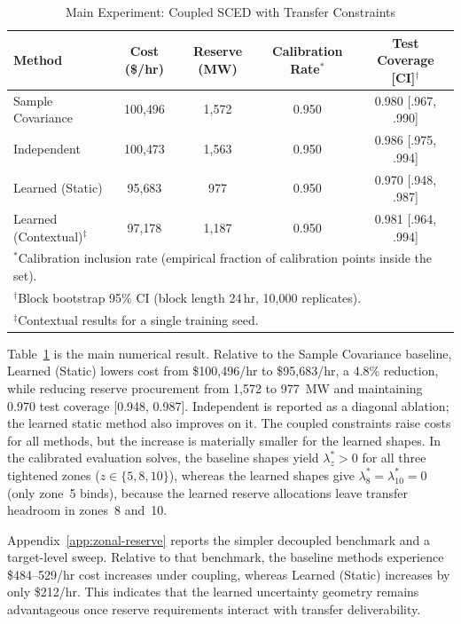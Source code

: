 \documentclass[11pt]{article}
\theoremstyle{definition}
\begin{document}
\begin{table}[!t]
\caption{Main Experiment: Coupled SCED with Transfer Constraints}
\label{tab:coupled}
\centering\footnotesize\setlength{\tabcolsep}{4pt}
\begin{tabular}{lcccc}
\toprule
\textbf{Method} & \textbf{Cost (\$/hr)} & \textbf{Reserve (MW)} & \textbf{Calibration Rate$^*$} & \textbf{Test Coverage [CI]$^\dagger$} \\
\midrule
Sample Covariance & 100{,}496 & 1{,}572 & 0.950 & 0.980 [.967, .990] \\
Independent & 100{,}473 & 1{,}563 & 0.950 & 0.986 [.975, .994] \\
Learned (Static) & 95{,}683 & 977 & 0.950 & 0.970 [.948, .987] \\
Learned (Contextual)$^\ddagger$ & 97{,}178 & 1{,}187 & 0.950 & 0.981 [.964, .994] \\
\bottomrule
\multicolumn{5}{l}{\footnotesize $^*$Calibration inclusion rate (empirical fraction of calibration points inside the set).} \\
\multicolumn{5}{l}{\footnotesize $^\dagger$Block bootstrap 95\% CI (block length 24\,hr, 10{,}000 replicates).} \\
\multicolumn{5}{l}{\footnotesize $^\ddagger$Contextual results for a single training seed.}
\end{tabular}
\end{table}

Table~\ref{tab:coupled} is the main numerical result. Relative to the Sample Covariance baseline, Learned (Static) lowers cost from \$100{,}496/hr to \$95{,}683/hr, a 4.8\% reduction, while reducing reserve procurement from 1{,}572 to 977~MW and maintaining 0.970 test coverage [0.948, 0.987]. Independent is reported as a diagonal ablation; the learned static method also improves on it. The coupled constraints raise costs for all methods, but the increase is materially smaller for the learned shapes. In the calibrated evaluation solves, the baseline shapes yield $\lambda_z^* > 0$ for all three tightened zones ($z \in \{5, 8, 10\}$), whereas the learned shapes give $\lambda_8^* = \lambda_{10}^* = 0$ (only zone~5 binds), because the learned reserve allocations leave transfer headroom in zones~8 and~10.

Appendix~\ref{app:zonal-reserve} reports the simpler decoupled benchmark and a target-level sweep. Relative to that benchmark, the baseline methods experience \$484--529/hr cost increases under coupling, whereas Learned (Static) increases by only \$212/hr. This indicates that the learned uncertainty geometry remains advantageous once reserve requirements interact with transfer deliverability.
\end{document}
